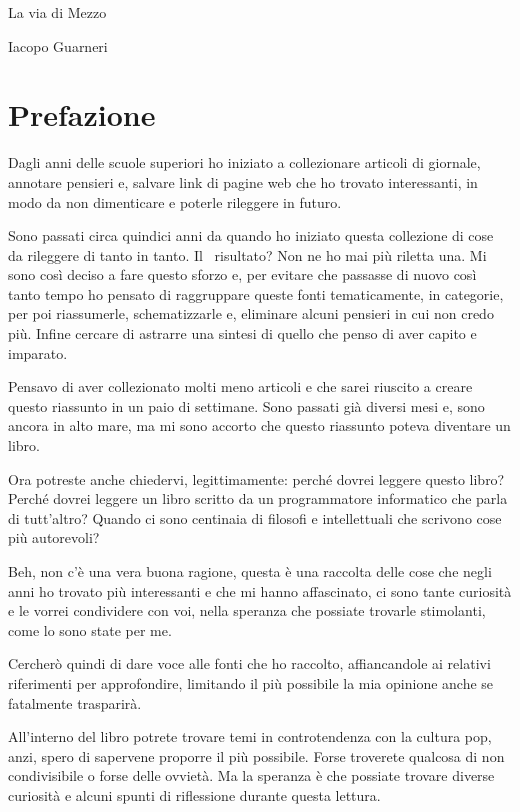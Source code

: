 \documentclass[12pt]{book} %
\date{2024-04-09}
\begin{document}
La via di Mezzo

Iacopo Guarneri

\tableofcontents %

\clearpage\section{Prefazione}
Dagli anni delle scuole superiori ho iniziato a collezionare articoli di giornale, annotare pensieri e, salvare link di
pagine web che ho trovato interessanti, in modo da non dimenticare e poterle rileggere in futuro.

Sono passati circa quindici anni da quando ho iniziato questa collezione di cose da rileggere di tanto in tanto. Il
\ risultato? Non ne ho mai più riletta una. Mi sono così deciso a fare questo sforzo e, per evitare che passasse di
nuovo così tanto tempo ho pensato di raggruppare queste fonti tematicamente, in categorie, per poi riassumerle,
schematizzarle e, eliminare alcuni pensieri in cui non credo più. Infine cercare di astrarre una sintesi di quello che
penso di aver capito e imparato. 

Pensavo di aver collezionato molti meno articoli e che sarei riuscito a creare questo riassunto in un paio di settimane.
Sono passati già diversi mesi e, sono ancora in alto mare, ma mi sono accorto che questo riassunto poteva diventare un
libro.

Ora potreste anche chiedervi, legittimamente: perché dovrei leggere questo libro? Perché dovrei leggere un libro scritto
da un programmatore informatico che parla di tutt'altro? Quando ci sono centinaia di filosofi e
intellettuali che scrivono cose più autorevoli?

Beh, non c'è una vera buona ragione, questa è una raccolta delle cose che negli anni ho trovato più
interessanti e che mi hanno affascinato, ci sono tante curiosità e le vorrei condividere con voi, nella speranza che
possiate trovarle stimolanti, come lo sono state per me.

Cercherò quindi di dare voce alle fonti che ho raccolto, affiancandole ai relativi riferimenti per approfondire,
limitando il più possibile la mia opinione anche se fatalmente trasparirà.

All'interno del libro potrete trovare temi in controtendenza con la cultura pop, anzi, spero di
sapervene proporre il più possibile. Forse troverete qualcosa di non condivisibile o forse delle ovvietà. Ma la
speranza è che possiate trovare diverse curiosità e alcuni spunti di riflessione durante questa lettura.
\end{document}
